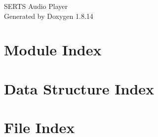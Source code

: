\documentclass[twoside]{book}
\newcommand{\+}{\discretionary{\mbox{\scriptsize$\hookleftarrow$}}{}{}}
\newcommand{\clearemptydoublepage}{%
  \newpage{\pagestyle{empty}\cleardoublepage}%
}
\begin{document}
\hypersetup{pageanchor=false,
             bookmarksnumbered=true,
             pdfencoding=unicode
            }
\begin{titlepage}
\vspace*{7cm}
\begin{center}%
{\Large S\+E\+R\+TS Audio Player }\\
\vspace*{1cm}
{\large Generated by Doxygen 1.8.14}\\
\end{center}
\end{titlepage}
\clearemptydoublepage
{}
\tableofcontents
\clearemptydoublepage
{}
\hypersetup{pageanchor=true}

\chapter{Module Index}

\chapter{Data Structure Index}

\chapter{File Index}

\end{document}
